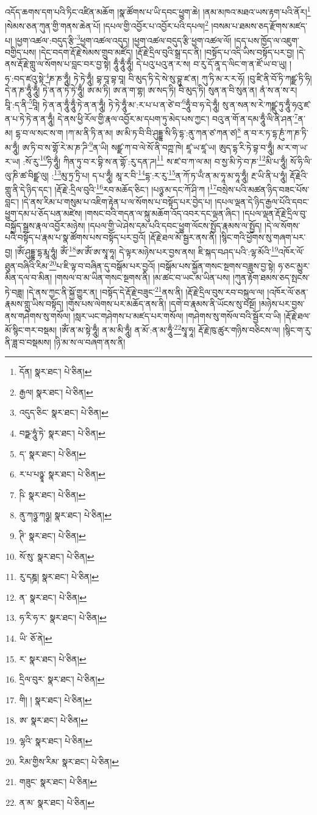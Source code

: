 འདོད་ཆགས་དག་པའི་ཏིང་འཛིན་མཆོག །སྣ་ཚོགས་པ་ཡི་དབང་ཕྱུག་ཆེ། །ནམ་མཁའ་མཐའ་ཡས་རྟག་པའི་ནོར།\footnote{དོན།  སྣར་ཐང་།  པེ་ཅིན། } །སེམས་ཅན་ཀུན་གྱི་གནས་ཆེན་པོ། །དཔལ་གྱི་འབྱོར་པ་འབྱོར་པའི་དཔལ།\footnote{རྒྱལ།  སྣར་ཐང་།  པེ་ཅིན། } །བསམ་པ་ཐམས་ཅད་རྫོགས་མཛད་པ། །ཕྱག་འཚལ་:བདུད་རྩི་\footnote{འདུད་ཅིང་  སྣར་ཐང་།  པེ་ཅིན། }ཕྱག་འཚལ་འདུད། །ཕྱག་འཚལ་བདུད་རྩི་ཕྱག་འཚལ་ལོ། །དད་པས་ཁྱོད་ལ་འཇུག་བགྱིད་པས། །དེང་བདག་རྡོ་རྗེ་སེམས་གྲུབ་མཛོད། །རྡོ་རྗེ་དྲིལ་བུའི་སྒྲ་དང་ནི། །བསྟོད་པ་འདི་ཡིས་བསྟོད་པར་བྱ། །དེ་ནས་རྡོ་རྗེ་གླུ་ལ་སོགས་པ་བླང་བར་བྱ་སྟེ། ཧཱུྃ་ཧཱུྃ་ཧཱུྃ། དེ་པའུ་པའུ་ན་ར་ས། བ་རུ་དོ་ནཱ་ད་ལིང་ག་ན་ཛོ་ཡ་བ་ཡུ། །ཧ་:བད་ཛའུ་སྟེ་\footnote{བཏྫ་ཧཱུཾ་ཏེ་  སྣར་ཐང་།  པེ་ཅིན། }ཎ་ཎ་ཧཱུྃ། ཏེ་ཏེ་ཧཱུྃ། བྷ་བཱ་བྷ་བཱ། བི་མུད་ཏི་དེ་སེ་སུ་བྷུ་ཛ་ན། ཀུ་ཏི་མ་ར་ར་ཧོ། །བུ་ཛི་ནི་བོ་ཏི་ཀཛྫ་ཏི་ཧི། དེ་ན་ཎ་ཧཱུྃ་ཧཱུྃ། ཏེ་ན་ན་ཏེ་ཏེ་ཧཱུྃ། ཨ་མ་ཏི། ཨ་ན་ག་གྷ། ཨ་སད་ཏི། བི་མུད་ཏི། སུན་ན་བི་སུན་ན། ནཾ་ས་ན་ས་ར། བཱི་:ད་ནི་\footnote{ད་  སྣར་ཐང་།  པེ་ཅིན། }བཱི། ཏེ་ན་ན་ཧཱུྃ་ཧཱུྃ་ཏེ་ན་ན་ཧཱུྃ། ཏེ་ཏེ་ཧཱུྃ་མ་:ར་པ་པ་ན་ཙེ་བ་\footnote{ར་པ་པཉྩཱ་  སྣར་ཐང་།  པེ་ཅིན། }ཧཱུྃ་བ་ཧ་དེ་ཧཱུྃ། སུ་ན་སན་ས་རེ་ཀཛྫུ་ཏུ་ཧཱུྃ་ཧའུ་ཛ་ན་པ་ཏེ་ཏེ་ན་ན་ཧཱུྃ། དེ་ནས་ཕྱི་རོལ་གྱི་རྣལ་འབྱོར་མ་དཔག་ཏུ་མེད་པས་ཀྱང་། བའུ་ན་གོ་ན་དམ་ཧཱུྃ་ལི་ནི་ཤན་\footnote{ཥི་  སྣར་ཐང་།  པེ་ཅིན། }ན་མ། དྷ་བ་ལ་སང་ས་ག །ཀ་མ་ནི་ཏི་ན་མ། ཨ་མི་ཏ་བི་བི་ཤུདྡྷ་སི་ཧི་དྷ་:ནུ་ཀན་ཙ་ཀན་ཙ།\footnote{ནུ་ཀཉྩ་ཀཉྩ།  སྣར་ཐང་།  པེ་ཅིན། } ན་བ་ར་ཏ་དྷ་ཎུཾ་ཀ་ཎ་ཏི་མ་ཧཱུྃ། ཨ་ཏི་བ་ས་གྷོ་རེ་མ་ཎ་ཌི་\footnote{ཊི་  སྣར་ཐང་།  པེ་ཅིན། }ན་ཡི། སཛྫ་ཀ་བ་ལེ་སོ་ནི་བཀྵ་ཁེ། ཛཱ་ཡ་ཛཱ་ཡ། ཨུད་དྷ་རི་ཏེ་བྷ་བ་ཧཱུྃ། མ་ར་ག་ཡ་ར་ཡ། :སོ་རུ་\footnote{སོ་སུ་  སྣར་ཐང་།  པེ་ཅིན། }ཧི་ཧཱུྃ། ཀིན་ཏུ་བ་ར་བྷི་ས་ན་གྷོ་:རུ་དན་ཌ།\footnote{རུ་དཎྜ།  སྣར་ཐང་།  པེ་ཅིན། } ས་ཛ་བ་ཀ་ལ་མ། བ་སྱ་མི་ཏེ་བ་ཎ་\footnote{ན་  སྣར་ཐང་།  པེ་ཅིན། }མི་པ་ཧཱུྃ། སོ་ཧི་ལི་ལུ་ཎི་ཚ་བིཛྫ་ལུ། :\footnote{ཧ་རི་ཧ་ར་  སྣར་ཐང་།  པེ་ཅིན། }མུ་ཏྲ་ཏྲི་པ། ད་པ་ཧཱུྃ། མཱ་ར་བི་\footnote{ཡི་  ཅོ་ནེ། }དྷ་:ར་རུ་\footnote{ར་  སྣར་ཐང་།  པེ་ཅིན། }ན་ཀོ་ཏ་ཡྃ་ན་མ་ཧཱ་མ་ཧཱ་ཧཱུྃ། རྔ་ཡི་ནི་པ་ཧཱུཾ། རྡོ་རྗེའི་གླུ་ནི་དེ་ཉིད་དང་། །རྡོ་རྗེ་:དྲིལ་བུའི་\footnote{དྲིལ་བུར་  སྣར་ཐང་།  པེ་ཅིན། }རབ་མཆོད་ཅིང་། །པཉྩ་མ་དང་ཀོ་ཤི་ཀ །\footnote{གི། །  སྣར་ཐང་།  པེ་ཅིན། }བསྲེས་པའི་མཚན་ཉིད་བཟང་པོས་བླང་། །དེ་ནས་རིམ་པ་གསུམ་པ་འཇིག་རྟེན་པ་ལ་སོགས་པ་བསྟོད་པར་བྱེད་པ། །དཔལ་ལྡན་དེ་ཉིད་རྒྱལ་པོའི་དབང་ཕྱུག་དམ་པ་ཅོད་པན་མཛེས། །གསང་བའི་གདན་ལ་སྐུ་མཆོག་འོད་འབར་དང་ལྡན་ཞིང་། །དཔལ་ལྡན་རྡོ་རྗེ་དྲིལ་བུ་བསྐྱོད་སྒྲས་རྣལ་འབྱོར་མཉེས། །དཔལ་གྱི་ཡེ་ཤེས་དམ་པའི་དབང་ཕྱུག་ལོངས་སྤྱོད་རྣམས་ལ་སྤྱོད། །དེ་ལ་སོགས་པའི་བསྟོད་པ་རྣམ་པ་སྣ་ཚོགས་པས་བསྟོད་པར་བྱའོ། །རྡོ་རྗེ་ཐལ་མོ་སྦྱར་ནས་ནི། །སྙིང་གའི་ཕྱོགས་སུ་གཞག་པར་བྱ། །ཨོཾ་ཤུདྡྷ་དྷ་རྨཱ་ཧཱུཾ། ཨོཾ་\footnote{ཨ་  སྣར་ཐང་།  པེ་ཅིན། }ཨ་ཨོཾ་ཨ་སྭཱ་ཧཱ། དེ་ལྟར་མཉེས་པར་བྱས་ནས། ཇི་སྐད་བཤད་པའི་:ལྷ་མོའི་\footnote{ལྷའི་  སྣར་ཐང་།  པེ་ཅིན། }འཁོར་ལོ་ཐུན་བཞིའི་རིམ་\footnote{རིམ་གྱིས་རིམ་  སྣར་ཐང་།  པེ་ཅིན། }པ་ཇི་ལྟ་བ་བཞིན་དུ་བསྒོམ་པར་བྱའོ། །བསྒོམ་པས་སྐྱོན་གསང་སྔགས་བཟླས་བྱ་སྟེ། ཧ་ཅང་མྱུར་མིན་དལ་བ་མིན། །གསལ་བ་མ་ཡིན་གསང་སྔགས་ནི། །མ་ཚང་བ་ཡང་མ་ཡིན་པས། །ཀུན་རྟོག་ཐམས་ཅད་སྤངས་ཏེ་བཟླ། །དེ་ནས་ཀྱང་ནི་སྐྱོ་གྱུར་ན། །བསྟོད་དེ་རྡོ་རྗེ་བཟུང་\footnote{གཟུང་  སྣར་ཐང་།  པེ་ཅིན། }ནས་ནི། །རྡོ་རྗེ་དྲིལ་བུས་རབ་བསྐུལ་ལ། །འཁོར་ལོ་ཅན་རྣམས་གླུ་ཡིས་བསྟོད། །གུས་པས་ལེགས་པར་མཆོད་ནས་ནི། །དགེ་བ་རྣམས་ནི་ཡོངས་སུ་བསྔོ། །མཉེས་པར་བྱས་ནས་གཤེགས་སུ་གསོལ། །སླར་ཡང་གཤེགས་པ་མཛད་པར་གསོལ། །གཤེགས་སུ་གསོལ་བའི་སྦྱོར་བ་ཡི། །རྡོ་རྗེ་ཐལ་མོ་སྙིང་གར་བསྡམ། །ཨོཾ་ན་མ་སྟེ་ཧཱུྃ། ན་མ་མི་ཧཱུྃ། ན་མོ་:ན་མ་ཧཱུྃ་\footnote{ན་མ་  སྣར་ཐང་།  པེ་ཅིན། }སྭཱ་ཧཱ། རྡོ་རྗེ་ཁུ་ཚུར་གཉིས་བཅིངས་ལ། །སྙིང་ག་རུ་ནི་ཟླ་བ་བསྡམས། །ཉི་མ་ས་ལ་བཞག་ནས་ནི། 